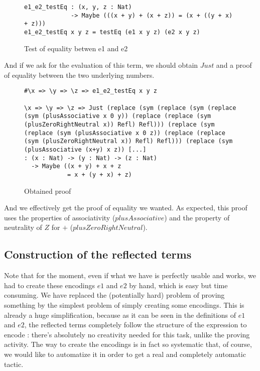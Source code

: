 \begin{figure}[H]
\figrule
\begin{center}
\begin{verbatim}
e1_e2_testEq : (x, y, z : Nat) 
             -> Maybe (((x + y) + (x + z)) = (x + ((y + x) + z)))
e1_e2_testEq x y z = testEq (e1 x y z) (e2 x y z)
\end{verbatim}
\end{center}
\caption{Test of equality betwen e1 and e2}
\figrule
\end{figure}


And if we ask for the evaluation of this term, we should obtain $Just$ and a proof of equality between the two underlying numbers.

\begin{figure}[H]
\figrule
\begin{center}
\begin{verbatim}
#\x => \y => \z => e1_e2_testEq x y z

\x => \y => \z => Just (replace (sym (replace (sym (replace 
(sym (plusAssociative x 0 y)) (replace (replace (sym 
(plusZeroRightNeutral x)) Refl) Refl))) (replace (sym 
(replace (sym (plusAssociative x 0 z)) (replace (replace 
(sym (plusZeroRightNeutral x)) Refl) Refl))) (replace (sym 
(plusAssociative (x+y) x z)) [...]
: (x : Nat) -> (y : Nat) -> (z : Nat) 
  -> Maybe ((x + y) + x + z 
            = x + (y + x) + z)
\end{verbatim}
\end{center}
\caption{Obtained proof}
\figrule
\end{figure}

And we effectively get the proof of equality we wanted. As expected, this proof uses the properties of associativity ($plusAssociative$) and the property of neutrality of $Z$ for $+$ ($plusZeroRightNeutral$).


\subsection{Construction of the reflected terms}

Note that for the moment, even if what we have is perfectly usable and works, we had to create these encodings $e1$ and $e2$ by hand, which is easy but time consuming. We have replaced the (potentially hard) problem of proving something by the simplest problem of simply creating some encodings. This is already a huge simplification, because as it can be seen in the definitions of $e1$ and $e2$, the reflected terms completely follow the structure of the expression to encode : there's absolutely no creativity needed for this task, unlike the proving activity. The way to create the encodings is in fact so systematic that, of course, we would like to automatize it in order to get a real and completely automatic tactic.

